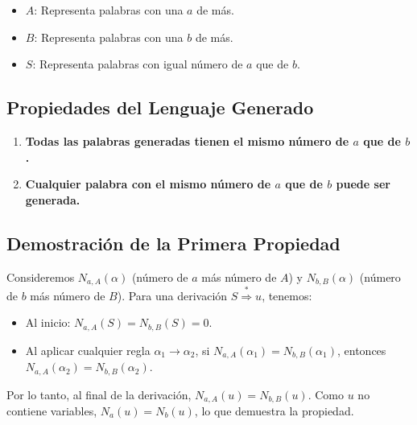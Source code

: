 \documentclass[12pt]{book} %
\providecommand{\tightlist}{%
  \setlength{\itemsep}{0pt}\setlength{\parskip}{0pt}}
\begin{document}
\begin{itemize}
\tightlist
\item
  \(A\): Representa palabras con una \(a\) de más.\\
\item
  \(B\): Representa palabras con una \(b\) de más.\\
\item
  \(S\): Representa palabras con igual número de \(a\) que de \(b\).
\end{itemize}

\hypertarget{propiedades-del-lenguaje-generado}{%
\subsection{Propiedades del Lenguaje
Generado}\label{propiedades-del-lenguaje-generado}}

\begin{enumerate}
\def\labelenumi{\arabic{enumi}.}
\tightlist
\item
  \textbf{Todas las palabras generadas tienen el mismo número de \(a\)
  que de \(b\).}\\
\item
  \textbf{Cualquier palabra con el mismo número de \(a\) que de \(b\)
  puede ser generada.}
\end{enumerate}

\hypertarget{demostraciuxf3n-de-la-primera-propiedad}{%
\subsection{Demostración de la Primera
Propiedad}\label{demostraciuxf3n-de-la-primera-propiedad}}

\begin{demostracion}
Consideremos $N_{a,A}(\alpha)$ (número de $a$ más número de $A$) y $N_{b,B}(\alpha)$ (número de $b$ más número de $B$). Para una derivación $S \overset{*}{\Rightarrow} u$, tenemos:  

\begin{itemize}
    \item Al inicio: $N_{a,A}(S) = N_{b,B}(S) = 0$.  
    \item Al aplicar cualquier regla $\alpha_1 \to \alpha_2$, si $N_{a,A}(\alpha_1) = N_{b,B}(\alpha_1)$, entonces $N_{a,A}(\alpha_2) = N_{b,B}(\alpha_2)$.  
\end{itemize}

Por lo tanto, al final de la derivación, $N_{a,A}(u) = N_{b,B}(u)$. Como $u$ no contiene variables, $N_a(u) = N_b(u)$, lo que demuestra la propiedad.
\end{demostracion}
\end{document}

